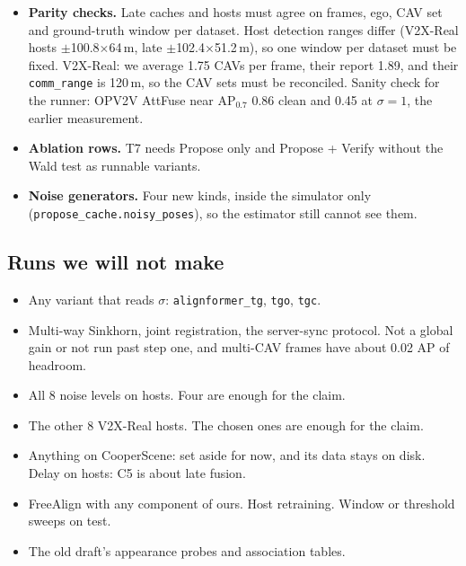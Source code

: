\begin{itemize}
  \item[\textbf{G7}] \textbf{Parity checks.} Late caches and hosts must agree on frames, ego, CAV set and ground-truth window per dataset. Host detection ranges differ (V2X-Real hosts $\pm$100.8$\times$64\,m, late $\pm$102.4$\times$51.2\,m), so one window per dataset must be fixed. V2X-Real: we average 1.75 CAVs per frame, their report 1.89, and their \texttt{comm\_range} is 120\,m, so the CAV sets must be reconciled. Sanity check for the runner: OPV2V AttFuse near AP$_{0.7}$ 0.86 clean and 0.45 at $\sigma=1$, the earlier measurement.
  \item[\textbf{G9}] \textbf{Ablation rows.} T7 needs Propose only and Propose + Verify without the Wald test as runnable variants.
  \item[\textbf{G8}] \textbf{Noise generators.} Four new kinds, inside the simulator only (\texttt{propose\_cache.noisy\_poses}), so the estimator still cannot see them.
\end{itemize}

\subsection*{Runs we will not make}
\begin{itemize}\setlength\itemsep{1pt}
  \item Any variant that reads $\sigma$: \texttt{alignformer\_tg}, \texttt{tgo}, \texttt{tgc}.
  \item Multi-way Sinkhorn, joint registration, the server-sync protocol. Not a global gain or not run past step one, and multi-CAV frames have about 0.02 AP of headroom.
  \item All 8 noise levels on hosts. Four are enough for the claim.
  \item The other 8 V2X-Real hosts. The chosen ones are enough for the claim.
  \item Anything on CooperScene: set aside for now, and its data stays on disk. Delay on hosts: C5 is about late fusion.
  \item FreeAlign with any component of ours. Host retraining. Window or threshold sweeps on test.
  \item The old draft's appearance probes and association tables.
\end{itemize}

